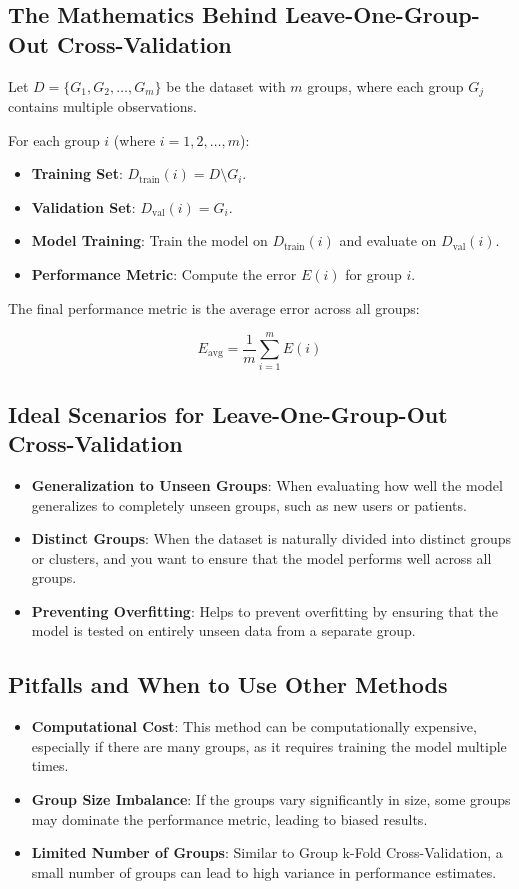\documentclass[10pt]{article}
\begin{document}
\subsection{The Mathematics Behind Leave-One-Group-Out Cross-Validation}
Let \(D = \{G_1, G_2, \dots, G_m\}\) be the dataset with \(m\) groups, where each group \(G_j\) contains multiple observations.

For each group \(i\) (where \(i=1,2,\dots,m\)):

\begin{itemize}
    \item \textbf{Training Set}: \(D_{\text{train}}(i) = D \setminus G_i\).
    \item \textbf{Validation Set}: \(D_{\text{val}}(i) = G_i\).
    \item \textbf{Model Training}: Train the model on \(D_{\text{train}}(i)\) and evaluate on \(D_{\text{val}}(i)\).
    \item \textbf{Performance Metric}: Compute the error \(E(i)\) for group \(i\).
\end{itemize}

The final performance metric is the average error across all groups:

\[
E_{\text{avg}} = \frac{1}{m} \sum_{i=1}^{m} E(i)
\]

\subsection{Ideal Scenarios for Leave-One-Group-Out Cross-Validation}
\begin{itemize}
    \item \textbf{Generalization to Unseen Groups}: When evaluating how well the model generalizes to completely unseen groups, such as new users or patients.
    \item \textbf{Distinct Groups}: When the dataset is naturally divided into distinct groups or clusters, and you want to ensure that the model performs well across all groups.
    \item \textbf{Preventing Overfitting}: Helps to prevent overfitting by ensuring that the model is tested on entirely unseen data from a separate group.
\end{itemize}

\subsection{Pitfalls and When to Use Other Methods}
\begin{itemize}
    \item \textbf{Computational Cost}: This method can be computationally expensive, especially if there are many groups, as it requires training the model multiple times.
    \item \textbf{Group Size Imbalance}: If the groups vary significantly in size, some groups may dominate the performance metric, leading to biased results.
    \item \textbf{Limited Number of Groups}: Similar to Group k-Fold Cross-Validation, a small number of groups can lead to high variance in performance estimates.
\end{itemize}
\end{document}
